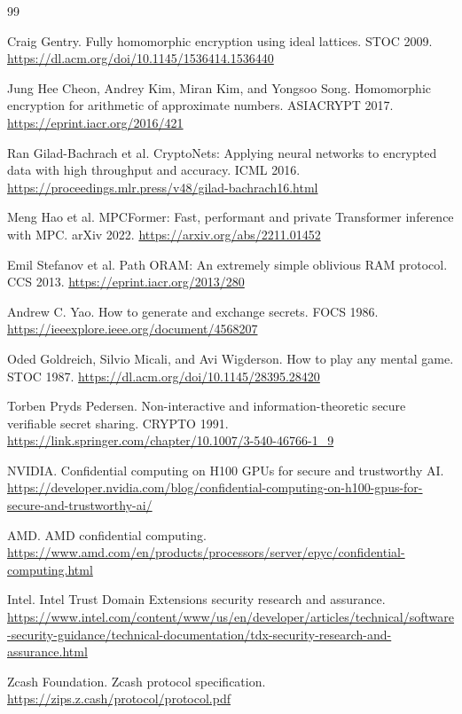 \documentclass[11pt]{article}
\begin{document}
\newpage
\begin{thebibliography}{99}

Craig Gentry.
\newblock Fully homomorphic encryption using ideal lattices.
\newblock STOC 2009.
\newblock \url{https://dl.acm.org/doi/10.1145/1536414.1536440}

Jung Hee Cheon, Andrey Kim, Miran Kim, and Yongsoo Song.
\newblock Homomorphic encryption for arithmetic of approximate numbers.
\newblock ASIACRYPT 2017.
\newblock \url{https://eprint.iacr.org/2016/421}

Ran Gilad-Bachrach et al.
\newblock CryptoNets: Applying neural networks to encrypted data with high
throughput and accuracy.
\newblock ICML 2016.
\newblock \url{https://proceedings.mlr.press/v48/gilad-bachrach16.html}

Meng Hao et al.
\newblock MPCFormer: Fast, performant and private Transformer inference with
MPC.
\newblock arXiv 2022.
\newblock \url{https://arxiv.org/abs/2211.01452}

Emil Stefanov et al.
\newblock Path ORAM: An extremely simple oblivious RAM protocol.
\newblock CCS 2013.
\newblock \url{https://eprint.iacr.org/2013/280}

Andrew C. Yao.
\newblock How to generate and exchange secrets.
\newblock FOCS 1986.
\newblock \url{https://ieeexplore.ieee.org/document/4568207}

Oded Goldreich, Silvio Micali, and Avi Wigderson.
\newblock How to play any mental game.
\newblock STOC 1987.
\newblock \url{https://dl.acm.org/doi/10.1145/28395.28420}

Torben Pryds Pedersen.
\newblock Non-interactive and information-theoretic secure verifiable secret
sharing.
\newblock CRYPTO 1991.
\newblock \url{https://link.springer.com/chapter/10.1007/3-540-46766-1_9}

NVIDIA.
\newblock Confidential computing on H100 GPUs for secure and trustworthy AI.
\newblock \url{https://developer.nvidia.com/blog/confidential-computing-on-h100-gpus-for-secure-and-trustworthy-ai/}

AMD.
\newblock AMD confidential computing.
\newblock \url{https://www.amd.com/en/products/processors/server/epyc/confidential-computing.html}

Intel.
\newblock Intel Trust Domain Extensions security research and assurance.
\newblock \url{https://www.intel.com/content/www/us/en/developer/articles/technical/software-security-guidance/technical-documentation/tdx-security-research-and-assurance.html}

Zcash Foundation.
\newblock Zcash protocol specification.
\newblock \url{https://zips.z.cash/protocol/protocol.pdf}

\end{thebibliography}
\end{document}
